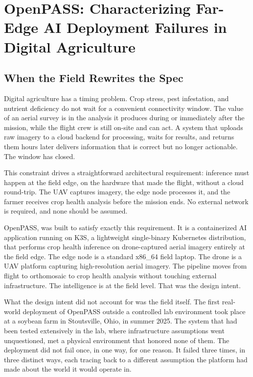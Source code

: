 
\chapter{OpenPASS: Characterizing Far-Edge AI Deployment Failures in Digital Agriculture}
\label{ch:openpass}

\section{When the Field Rewrites the Spec}
\label{sec:ch3_intro}
Digital agriculture has a timing problem. Crop stress, pest infestation, and nutrient deficiency do not wait for a convenient connectivity window. The value of an aerial survey is in the analysis it produces during or immediately after the mission, while the flight crew is still on-site and can act. A system that uploads raw imagery to a cloud backend for processing, waits for results, and returns them hours later delivers information that is correct but no longer actionable. The window has closed.

This constraint drives a straightforward architectural requirement: inference must happen at the field edge, on the hardware that made the flight, without a cloud round-trip. The UAV captures imagery, the edge node processes it, and the farmer receives crop health analysis before the mission ends. No external network is required, and none should be assumed.

OpenPASS, was built to satisfy exactly this requirement. It is a containerized AI application running on K3S, a lightweight single-binary Kubernetes distribution, that performs crop health inference on drone-captured aerial imagery entirely at the field edge. The edge node is a standard x86\_64 field laptop. The drone is a UAV platform capturing high-resolution aerial imagery. The pipeline moves from flight to orthomosaic to crop health analysis without touching external infrastructure. The intelligence is at the field level. That was the design intent.

What the design intent did not account for was the field itself. The first real-world deployment of OpenPASS outside a controlled lab environment took place at a soybean farm in Stoutsville, Ohio, in summer 2025. The system that had been tested extensively in the lab, where infrastructure assumptions went unquestioned, met a physical environment that honored none of them. The deployment did not fail once, in one way, for one reason. It failed three times, in three distinct ways, each tracing back to a different assumption the platform had made about the world it would operate in.

